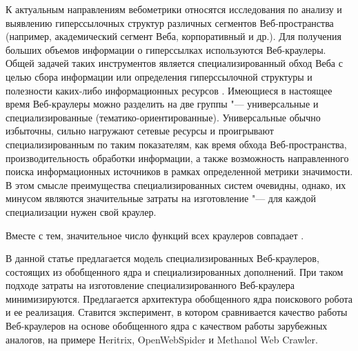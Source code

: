 К актуальным направлениям вебометрики относятся исследования по анализу и выявлению гиперссылочных структур различных сегментов Веб-пространства (например, академический сегмент Веба, корпоративный и др.). Для получения больших объемов информации о гиперссылках используются Веб-краулеры. Общей задачей таких инструментов является специализированный обход Веба с целью сбора информации или определения гиперссылочной структуры и полезности каких-либо информационных ресурсов \cite{BlekanovBondarenko1,BlekanovBondarenko2}. Имеющиеся в настоящее время Веб-краулеры можно разделить на две группы "--- универсальные и специализированные (тематико-ориентированные). Универсальные обычно избыточны, сильно нагружают сетевые ресурсы и проигрывают специализированным по таким показателям, как время обхода Веб-пространства, производительность обработки информации, а также возможность направленного поиска информационных источников в рамках определенной метрики значимости. В этом смысле преимущества специализированных систем очевидны, однако, их минусом являются значительные затраты на изготовление "--- для каждой специализации нужен свой краулер.

Вместе с тем, значительное число функций всех краулеров совпадает \cite{ArasuChoGM,Bar-Ilan,ChoGM,NajorkHeydon}.

В данной статье предлагается модель специализированных Веб-краулеров, состоящих из обобщенного ядра и специализированных дополнений. При таком подходе затраты на изготовление специализированного Веб-краулера минимизируются. Предлагается архитектура обобщенного ядра поискового робота и ее реализация. Ставится эксперимент, в котором сравнивается качество работы Веб-краулеров на основе обобщенного ядра с качеством работы зарубежных аналогов, на примере Heritrix, OpenWebSpider и Methanol Web Crawler.

